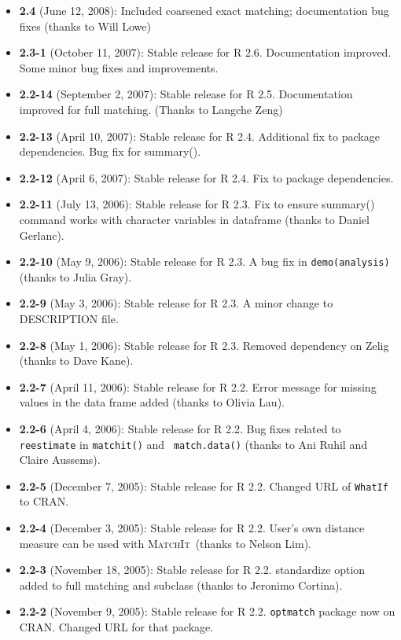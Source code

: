 \documentclass[oneside,letterpaper,12pt]{book}
\newcommand{\MatchIt}{\textsc{MatchIt}}
\begin{document}
\begin{itemize}
\item \textbf{2.4} (June 12, 2008): Included coarsened exact matching;
  documentation bug fixes (thanks to Will Lowe)
\item \textbf{2.3-1} (October 11, 2007): Stable release for R
  2.6. Documentation improved. Some minor bug fixes and improvements.
\item \textbf{2.2-14} (September 2, 2007): Stable release for R 2.5.
  Documentation improved for full matching. (Thanks to Langche Zeng)
\item \textbf{2.2-13} (April 10, 2007): Stable release for R
  2.4. Additional fix to package dependencies. Bug fix for summary().
\item \textbf{2.2-12} (April 6, 2007): Stable release for R 2.4. Fix
  to package dependencies.
\item \textbf{2.2-11} (July 13, 2006): Stable release for R 2.3.
  Fix to ensure summary() command works with character variables in dataframe (thanks to Daniel Gerlanc).
\item \textbf{2.2-10} (May 9, 2006): Stable release for R 2.3.
  A bug fix in {\tt demo(analysis)} (thanks to Julia Gray).
\item \textbf{2.2-9} (May 3, 2006): Stable release for R 2.3.
  A minor change to DESCRIPTION file.
\item \textbf{2.2-8} (May 1, 2006): Stable release for R 2.3.
  Removed dependency on Zelig (thanks to Dave Kane).
\item \textbf{2.2-7} (April 11, 2006): Stable release for R 2.2.
  Error message for missing values in the data frame added
  (thanks to Olivia Lau).
\item \textbf{2.2-6} (April 4, 2006): Stable release for R 2.2.
  Bug fixes related to {\tt reestimate} in {\tt matchit()} and {\tt
  match.data()} (thanks to Ani Ruhil and Claire Aussems). 
\item \textbf{2.2-5} (December 7, 2005): Stable release for R 2.2.
  Changed URL of {\tt WhatIf} to CRAN.
\item \textbf{2.2-4} (December 3, 2005): Stable release for R 2.2.
  User's own distance measure can be used with \MatchIt\, (thanks to
  Nelson Lim).
\item \textbf{2.2-3} (November 18, 2005): Stable release for R 2.2.
  standardize option added to full matching and subclass (thanks to
  Jeronimo Cortina).
\item \textbf{2.2-2} (November 9, 2005): Stable release for R 2.2.
  {\tt optmatch} package now on CRAN. Changed URL for that package. 

\end{itemize}
\end{document}
